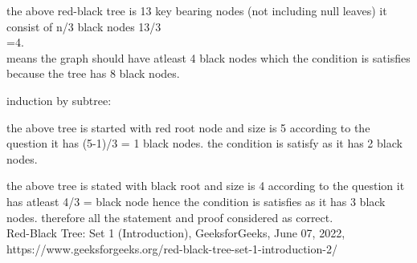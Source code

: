 \documentclass[10pt,letterpaper]{article}
\begin{document}
\begin{itemize}
the above red-black tree is 13 key bearing nodes (not including null leaves) it consist of n/3 black nodes 13/3\\
=4.\\
means the graph should have atleast 4 black nodes which the condition is satisfies because the tree has 8 black nodes. 

induction by subtree:\\

the above tree is started with red root node and size is 5 according to the question it has (5-1)/3 = 1 black nodes.
the condition is satisfy as it has 2 black nodes.


the above tree is stated with black root and size is 4 according to the question it has atleast 4/3 = black node hence the condition is satisfies as it has 3 black nodes. therefore all the statement and proof considered as correct.\\

 Red-Black Tree: Set 1 (Introduction), GeeksforGeeks, June 07, 2022, https://www.geeksforgeeks.org/red-black-tree-set-1-introduction-2/\\

\end{itemize}
\newpage 
\end{document}
